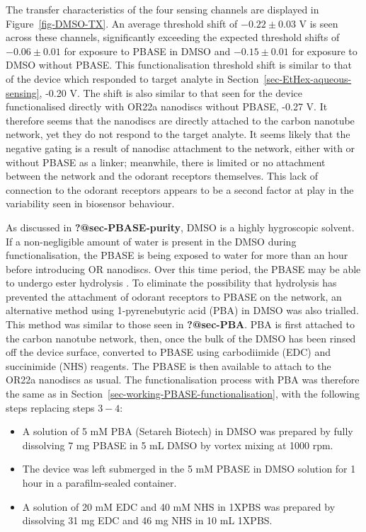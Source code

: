 \documentclass[
  a4paper,
]{scrbook}
\begin{document}
The transfer characteristics of the four sensing channels are displayed
in Figure~\ref{fig-DMSO-TX}. An average threshold shift of
\(-0.22\pm0.03\) V is seen across these channels, significantly
exceeding the expected threshold shifts of \(-0.06\pm0.01\) for exposure
to PBASE in DMSO and \(-0.15\pm0.01\) for exposure to DMSO without
PBASE. This functionalisation threshold shift is similar to that of the
device which responded to target analyte in
Section~\ref{sec-EtHex-aqueous-sensing}, -0.20 V. The shift is also
similar to that seen for the device functionalised directly with OR22a
nanodiscs without PBASE, -0.27 V. It therefore seems that the nanodiscs
are directly attached to the carbon nanotube network, yet they do not
respond to the target analyte. It seems likely that the negative gating
is a result of nanodisc attachment to the network, either with or
without PBASE as a linker; meanwhile, there is limited or no attachment
between the network and the odorant receptors themselves. This lack of
connection to the odorant receptors appears to be a second factor at
play in the variability seen in biosensor behaviour.

As discussed in \textbf{?@sec-PBASE-purity}, DMSO is a highly
hygroscopic solvent. If a non-negligible amount of water is present in
the DMSO during functionalisation, the PBASE is being exposed to water
for more than an hour before introducing OR nanodiscs. Over this time
period, the PBASE may be able to undergo ester hydrolysis
\autocite{Hermanson2013-3}. To eliminate the possibility that hydrolysis
has prevented the attachment of odorant receptors to PBASE on the
network, an alternative method using 1-pyrenebutyric acid (PBA) in DMSO
was also trialled. This method was similar to those seen in
\textbf{?@sec-PBA}. PBA is first attached to the carbon nanotube
network, then, once the bulk of the DMSO has been rinsed off the device
surface, converted to PBASE using carbodiimide (EDC) and succinimide
(NHS) reagents. The PBASE is then available to attach to the OR22a
nanodiscs as usual. The functionalisation process with PBA was therefore
the same as in Section~\ref{sec-working-PBASE-functionalisation}, with
the following steps replacing steps \(3-4\):

\begin{itemize}
\item
  A solution of 5 mM PBA (Setareh Biotech) in DMSO was prepared by fully
  dissolving 7 mg PBASE in 5 mL DMSO by vortex mixing at 1000 rpm.
\item
  The device was left submerged in the 5 mM PBASE in DMSO solution for 1
  hour in a parafilm-sealed container.
\item
  A solution of 20 mM EDC and 40 mM NHS in 1XPBS was prepared by
  dissolving 31 mg EDC and 46 mg NHS in 10 mL 1XPBS.
\end{itemize}
\end{document}
